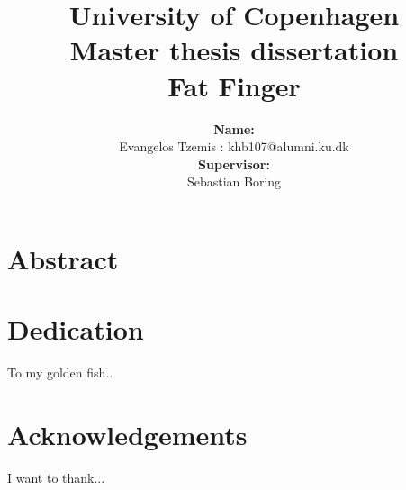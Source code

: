 \documentclass[10pt,twoside]{report}
\title{\textbf{University of Copenhagen} \\ 
 	\textbf{Master thesis dissertation} \\
 	 \textbf{Fat Finger}}
\author{ \textbf{Name:} \\ Evangelos Tzemis : khb107@alumni.ku.dk 
\\ \textbf{Supervisor:} \\ Sebastian Boring}
\begin{document}
\thispagestyle{empty}
\maketitle

\pagestyle{plain}
\cleardoublepage

\chapter*{Abstract}






\cleardoublepage


\chapter*{Dedication}
To my golden fish..
\cleardoublepage


\chapter*{Acknowledgements}
I want to thank...
\cleardoublepage

\tableofcontents
\cleardoublepage

\listoffigures
\cleardoublepage
\end{document}
